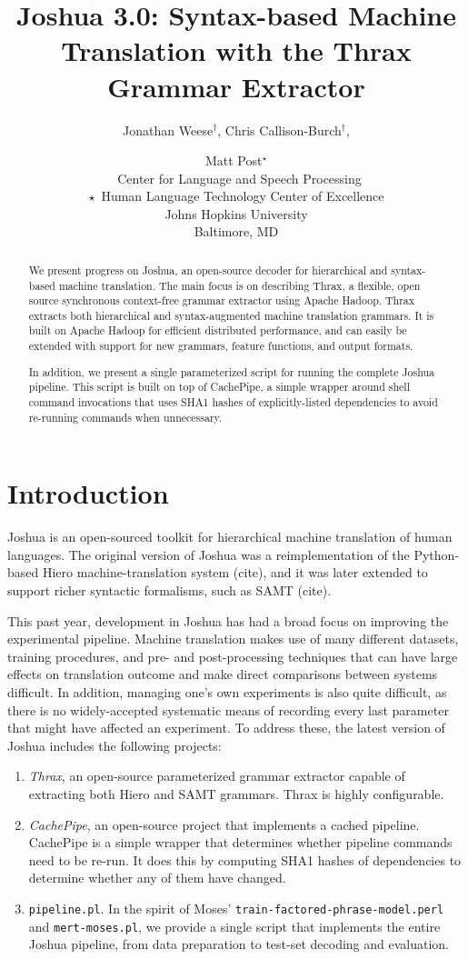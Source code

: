 \documentclass[11pt]{article}
\title{Joshua 3.0: Syntax-based Machine Translation with the Thrax
  Grammar Extractor}
\author{Jonathan Weese${}^\dag$, Chris Callison-Burch${}^\dag$, \and Matt Post${}^\star$ \\
\textdagger\ Center for Language and Speech Processing \\
$\star$\ Human Language Technology Center of Excellence \\
Johns Hopkins University \\
Baltimore, MD}
\date{}
\begin{document}
\maketitle

\begin{abstract}
We present progress on Joshua, an open-source decoder for hierarchical
and syntax-based machine translation.  The main focus
is on describing Thrax, a flexible, open source synchronous
context-free grammar extractor using Apache Hadoop.  Thrax extracts
both hierarchical \cite{Chiang2007} and syntax-augmented machine
translation \cite{samt2006} grammars.  It is built on Apache Hadoop for efficient
distributed performance, and can easily be extended with
support for new grammars, feature functions, and output formats.  

In addition, we present a single parameterized script for running the
complete Joshua pipeline.  This script is built on top of CachePipe, a
simple wrapper around shell command invocations that uses SHA1 hashes
of explicitly-listed dependencies to avoid re-running commands when
unnecessary.
\end{abstract}

\section{Introduction}

Joshua is an open-sourced toolkit for hierarchical machine translation
of human languages.  The original version of Joshua was a
reimplementation of the Python-based Hiero machine-translation system
(cite), and it was later extended to support richer syntactic
formalisms, such as SAMT (cite).

This past year, development in Joshua has had a broad focus on
improving the experimental pipeline.  Machine translation makes
use of many different datasets, training procedures, and pre- and
post-processing techniques that can have large effects on translation
outcome and make direct comparisons between systems difficult.  In addition,
managing one's own experiments is also quite difficult, as there is no
widely-accepted systematic means of recording every last parameter
that might have affected an experiment.  To address these, the latest
version of Joshua includes the following projects:

\begin{enumerate}
\item \emph{Thrax}, an open-source parameterized grammar extractor
  capable of extracting both Hiero and SAMT grammars.  Thrax is highly
  configurable.
\item \emph{CachePipe}, an open-source project that implements a cached
  pipeline.  CachePipe is a simple wrapper that determines whether
  pipeline commands need to be re-run.  It does this by computing SHA1
  hashes of dependencies to determine whether any of them have changed.
\item \verb|pipeline.pl|.  In the spirit of Moses'
  \verb|train-factored-phrase-model.perl| and \verb|mert-moses.pl|, we
  provide a single script that implements the entire Joshua pipeline,
  from data preparation to test-set decoding and evaluation.
\end{enumerate}
\end{document}
